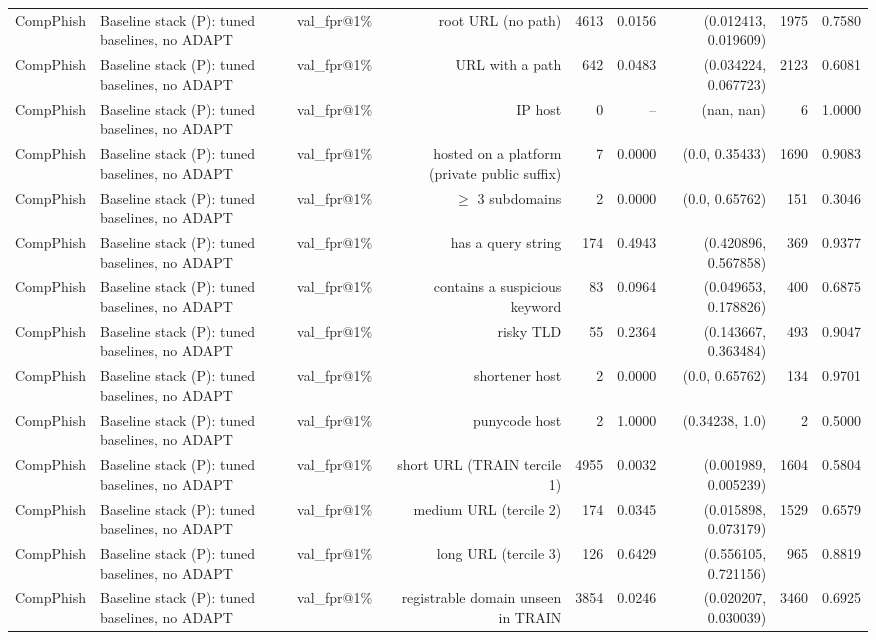 \begin{table}[t]
\begin{tabular}{llrrrrrrr}
CompPhish & Baseline stack (P): tuned baselines, no ADAPT & val\_fpr@1\% & root URL (no path) & 4613 & 0.0156 & (0.012413, 0.019609) & 1975 & 0.7580 \\
CompPhish & Baseline stack (P): tuned baselines, no ADAPT & val\_fpr@1\% & URL with a path & 642 & 0.0483 & (0.034224, 0.067723) & 2123 & 0.6081 \\
CompPhish & Baseline stack (P): tuned baselines, no ADAPT & val\_fpr@1\% & IP host & 0 & -- & (nan, nan) & 6 & 1.0000 \\
CompPhish & Baseline stack (P): tuned baselines, no ADAPT & val\_fpr@1\% & hosted on a platform (private public suffix) & 7 & 0.0000 & (0.0, 0.35433) & 1690 & 0.9083 \\
CompPhish & Baseline stack (P): tuned baselines, no ADAPT & val\_fpr@1\% & $\geq$ 3 subdomains & 2 & 0.0000 & (0.0, 0.65762) & 151 & 0.3046 \\
CompPhish & Baseline stack (P): tuned baselines, no ADAPT & val\_fpr@1\% & has a query string & 174 & 0.4943 & (0.420896, 0.567858) & 369 & 0.9377 \\
CompPhish & Baseline stack (P): tuned baselines, no ADAPT & val\_fpr@1\% & contains a suspicious keyword & 83 & 0.0964 & (0.049653, 0.178826) & 400 & 0.6875 \\
CompPhish & Baseline stack (P): tuned baselines, no ADAPT & val\_fpr@1\% & risky TLD & 55 & 0.2364 & (0.143667, 0.363484) & 493 & 0.9047 \\
CompPhish & Baseline stack (P): tuned baselines, no ADAPT & val\_fpr@1\% & shortener host & 2 & 0.0000 & (0.0, 0.65762) & 134 & 0.9701 \\
CompPhish & Baseline stack (P): tuned baselines, no ADAPT & val\_fpr@1\% & punycode host & 2 & 1.0000 & (0.34238, 1.0) & 2 & 0.5000 \\
CompPhish & Baseline stack (P): tuned baselines, no ADAPT & val\_fpr@1\% & short URL (TRAIN tercile 1) & 4955 & 0.0032 & (0.001989, 0.005239) & 1604 & 0.5804 \\
CompPhish & Baseline stack (P): tuned baselines, no ADAPT & val\_fpr@1\% & medium URL (tercile 2) & 174 & 0.0345 & (0.015898, 0.073179) & 1529 & 0.6579 \\
CompPhish & Baseline stack (P): tuned baselines, no ADAPT & val\_fpr@1\% & long URL (tercile 3) & 126 & 0.6429 & (0.556105, 0.721156) & 965 & 0.8819 \\
CompPhish & Baseline stack (P): tuned baselines, no ADAPT & val\_fpr@1\% & registrable domain unseen in TRAIN & 3854 & 0.0246 & (0.020207, 0.030039) & 3460 & 0.6925 \\

\end{tabular}
\end{table}
